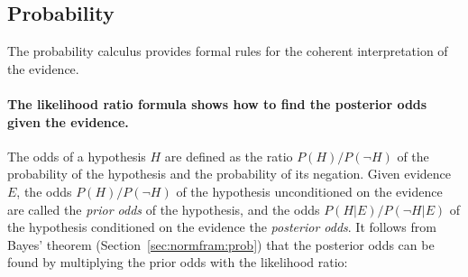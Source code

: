 \documentclass[10pt]{article}
\begin{document}




\subsection{Probability}

The probability calculus provides formal rules for the coherent interpretation of the evidence.


\paragraph{The likelihood ratio formula shows how to find the posterior odds given the evidence.} 
The odds of a hypothesis $H$ are defined as the ratio $P(H)/P(\neg H)$ of the probability of the hypothesis and the probability of its negation. Given evidence $E$, the odds $P(H)/P(\neg H)$ 
of the hypothesis unconditioned on the evidence are called the \emph{prior odds} of the hypothesis, and the odds $P(H | E)/P(\neg H | E)$ of the hypothesis 
conditioned on the evidence the \emph{posterior odds}. It follows from Bayes' theorem (Section~\ref{sec:normfram:prob}) that the posterior odds can 
be found by multiplying the prior odds with the likelihood ratio: 
\end{document}
